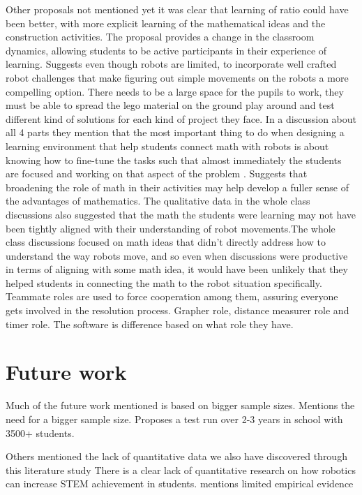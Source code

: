 \bigskip\noindent
Other proposals not mentioned yet
\cite{norton2004using}it was clear that learning of ratio could have been better, with more explicit learning of the mathematical ideas and the construction activities. 
\cite{mitnik2009collaborative} The proposal provides a change in the classroom dynamics, allowing students to be active participants in their experience of learning. 
\cite{silk2011resources} Suggests even though robots are limited, to incorporate well crafted robot challenges that make figuring out simple movements on the robots a more compelling option. 
\cite{lindh2007does} There needs to be a large space for the pupils to work, they must be able to spread the lego material on the ground play around and test different kind of solutions for each kind of project they face.
\cite{silk2011resources} In a discussion about all 4 parts they mention that the most important thing to do when designing a learning environment that help students connect math with robots is about knowing how to fine-tune the tasks such that almost immediately the students are focused and working on that aspect of the problem . 
\cite{silk2011resources} Suggests that broadening the role of math in their activities may help develop a fuller sense of the advantages of mathematics. The qualitative data in the whole class discussions also suggested that the math the students were learning may not have been tightly aligned with their understanding of robot movements.The whole class discussions focused on math ideas that didn’t directly address how to understand the way robots move, and so even when discussions were productive in terms of aligning with some math idea, it would have been unlikely that they helped students in connecting the math to the robot situation specifically. 
\cite{mitnik2009collaborative} Teammate roles are used to force cooperation among them, assuring everyone gets involved in the resolution process. Grapher role, distance measurer role and timer role. The software is difference based on what role they have. 

\section{Future work}
Much of the future work mentioned is based on bigger sample sizes. 
\cite{mitnik2009collaborative} Mentions the need for a bigger sample size.
\cite{lindh2007does} Proposes a test run over 2-3 years in school with 3500+ students. 

\bigskip\noindent
Others mentioned the lack of quantitative data we also have discovered through this literature study
\cite{barker2007robotics} There is a clear lack of quantitative research on how robotics can increase STEM achievement in students. 
\cite{williams2007acquisition} mentions limited empirical evidence

